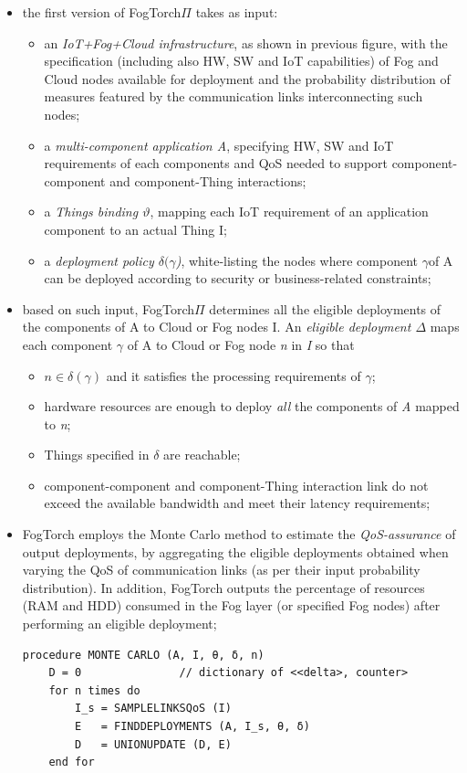 \documentclass[oneside]{article}
\begin{document}
\begin{itemize}
    \item the first version of FogTorch$\Pi$ takes as input:
        \begin{itemize}
            \item an \textit{IoT+Fog+Cloud infrastructure}, as shown in previous figure, with the specification (including also HW, SW and IoT capabilities) of Fog and Cloud nodes available for deployment and the probability distribution of measures featured by the communication links interconnecting such nodes;
            \item a \textit{multi-component application A}, specifying HW, SW and IoT requirements of each components and QoS needed to support component-component and component-Thing interactions;
            \item a \textit{Things binding $\vartheta$}, mapping each IoT requirement of an application component to an actual Thing I;
            \item a \textit{deployment policy $\delta(\gamma$)}, white-listing the nodes where component $\gamma$of A can be deployed according to security or business-related constraints;
        \end{itemize}
        
    \item based on such input, FogTorch$\Pi$ determines all the eligible deployments of the components of A to Cloud or Fog nodes I. An \textit{eligible deployment $\Delta$} maps each component $\gamma$ of A to Cloud or Fog node \textit{n} in \textit{I} so that
    \begin{itemize}
        \item $n \in \delta(\gamma)$ and it satisfies the processing requirements of $\gamma$;
        \item hardware resources are enough to deploy \textit{all} the components of \textit{A} mapped to \textit{n};
        \item Things specified in $\delta$ are reachable;
        \item component-component and component-Thing interaction link do not exceed the available bandwidth and meet their latency requirements;
    \end{itemize}
    
    \item FogTorch employs the Monte Carlo method to estimate the \textit{QoS-assurance} of output deployments, by aggregating the eligible deployments obtained when varying the QoS of communication links (as per their input probability distribution). In addition, FogTorch outputs the percentage of resources (RAM and HDD) consumed in the Fog layer (or specified Fog nodes) after performing an eligible deployment;
    \begin{verbatim}
procedure MONTE CARLO (A, I, θ, δ, n)
	D = 0               // dictionary of <<delta>, counter>
	for n times do
		I_s = SAMPLELINKSQoS (I)
		E   = FINDDEPLOYMENTS (A, I_s, θ, δ)
		D   = UNIONUPDATE (D, E)
	end for


\end{verbatim}
\end{itemize}
\end{document}
